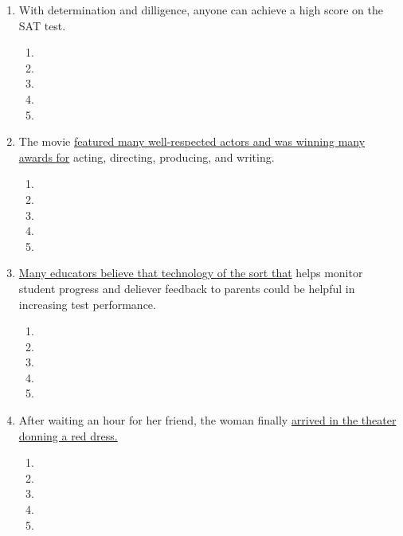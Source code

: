 \begin{enumerate}
\bigskip
\item With determination and dilligence, anyone can achieve a high score on the SAT test. 

\bigskip
\begin{enumerate}[label=(\Alph*)]

\item        \hrulefill
\item   \hrulefill
\item    \hrulefill
\item    \hrulefill
\item   \hrulefill
\end{enumerate}

\bigskip
\item The movie \ul{featured many well-respected actors and was winning many awards for} acting, directing, producing, and writing. 

\bigskip
\begin{enumerate}[label=(\Alph*)]

\item        \hrulefill
\item   \hrulefill
\item    \hrulefill
\item    \hrulefill
\item   \hrulefill
\end{enumerate}

\bigskip
\item \ul{Many educators believe that technology of the sort that} helps monitor student progress and deliever feedback to parents could be helpful in increasing test performance. 

\bigskip
\begin{enumerate}[label=(\Alph*)]

\item        \hrulefill
\item   \hrulefill
\item    \hrulefill
\item    \hrulefill
\item   \hrulefill
\end{enumerate}

\bigskip
\item After waiting an hour for her friend, the woman finally \ul{arrived in the theater donning a red dress.}

\bigskip
\begin{enumerate}[label=(\Alph*)]

\item        \hrulefill
\item   \hrulefill
\item    \hrulefill
\item    \hrulefill
\item   \hrulefill
\end{enumerate}


\end{enumerate}
